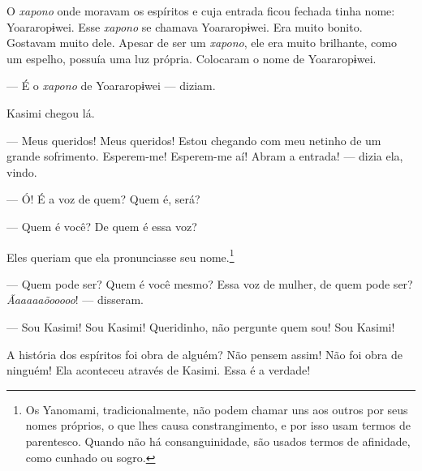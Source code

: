 
O \textit{xapono} onde moravam os espíritos e cuja entrada ficou fechada tinha
nome: Yoararopɨwei. Esse \textit{xapono} se chamava Yoararopɨwei. Era muito
bonito. Gostavam muito dele. Apesar de ser um \textit{xapono}, ele era muito
brilhante, como um espelho, possuía uma luz própria. Colocaram o nome de
Yoararopɨwei.

--- É o \textit{xapono} de Yoararopɨwei --- diziam. 

Kasimi chegou lá. 

--- Meus queridos! Meus queridos! Estou chegando com meu netinho de um
grande sofrimento. Esperem-me! Esperem-me aí! Abram a entrada! --- dizia ela,
vindo.

--- Ó! É a voz de quem? Quem é, será?


--- Quem é você? De quem é essa voz? 

Eles queriam que ela pronunciasse seu nome.\footnote{Os Yanomami, tradicionalmente, não podem chamar uns aos outros por seus nomes próprios, o que lhes causa constrangimento, e por isso usam termos de parentesco. Quando não há consanguinidade, são usados termos de afinidade, como cunhado ou sogro.} 

--- Quem pode ser? Quem é você mesmo? Essa voz de mulher, de quem pode
ser? \textit{Ãaaaaaõooooo}! --- disseram. 

--- Sou Kasimi! Sou Kasimi! Queridinho, não pergunte quem
sou! Sou Kasimi!


A história dos espíritos foi obra de alguém? Não pensem assim! Não foi
obra de ninguém! Ela aconteceu através de Kasimi. Essa é a verdade! 


